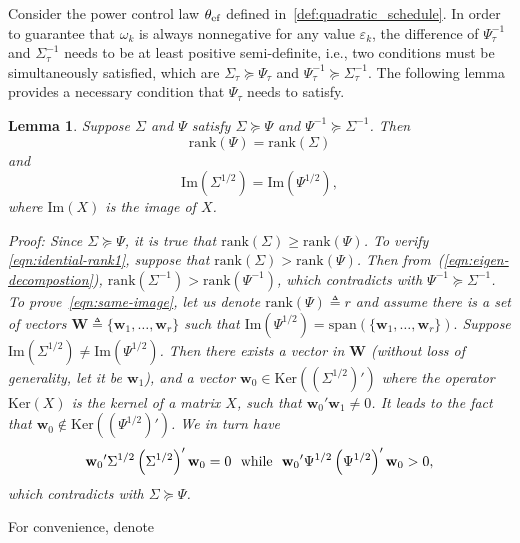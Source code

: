 \documentclass[twocolumn]{autart}    \usepackage{cite}
\newtheorem{lemma}[theorem]{Lemma}
\begin{document}
{{Consider the power control law $\theta_{\rm ef}$ defined in~\eqref{def:quadratic_schedule}.
In order to guarantee that $\omega_k$ is always nonnegative for any value $\varepsilon_k$, the difference of
$\Psi_\tau^{-1}$ and $\Sigma_\tau^{-1}$ needs to
be at least positive semi-definite, i.e.,
two conditions must be simultaneously satisfied, which
are  $\Sigma_\tau\succeq\Psi
_\tau$ and $\Psi_\tau^{-1}\succeq\Sigma
_\tau^{-1}.$ The following lemma
provides a necessary condition that $\Psi_\tau$ needs to satisfy.
\begin{lemma}\label{lemma:sigma-psi-property}
Suppose $\Sigma$ and $\Psi$ satisfy $\Sigma\succeq\Psi
$ and $\Psi^{-1}\succeq\Sigma^{-1}$. Then
\begin{equation}\label{eqn:idential-rank1}
\mathrm{rank}(\Psi)=
\mathrm{rank}(\Sigma)
\end{equation}
and
\begin{equation}\label{eqn:same-image}
\mathrm{Im}(\Sigma^{{1}/{2}})=
\mathrm{Im}(\Psi^{{1}/{2}}),
\end{equation}
where $\mathrm{Im}(X)$ is the image of $X$.
\begin{pf*}{Proof:}
Since $\Sigma\succeq \Psi$, it is true that
$\mathrm{rank}(\Sigma)\geq
\mathrm{rank}(\Psi)$.
To verify \eqref{eqn:idential-rank1}, suppose that $\mathrm{rank}(\Sigma)>
\mathrm{rank}(\Psi)$.
Then from~(\ref{eqn:eigen-decompostion}), $\mathrm{rank}(\Sigma^{-1})>
\mathrm{rank}(\Psi^{-1})$,
which contradicts with $\Psi^{-1}\succeq\Sigma^{-1}$.
To prove~\eqref{eqn:same-image}, let us
denote $\mathrm{rank}(\Psi)\triangleq r$ and  assume there is a set of vectors $\mathbf{W}\triangleq\{\mathbf{w}_1,\ldots,
\mathbf{w}_r\}$
such that
$\mathrm{Im}(\Psi^{{1}/{2}})=
\mathrm{span}\left(
\{\mathbf{w}_1,\ldots,\mathbf{w}_r\}
\right).$
Suppose $\mathrm{Im}(\Sigma^{{1}/{2}})
\neq\mathrm{Im}(\Psi^{{1}/{2}})$. Then
there exists a vector in
$\mathbf{W}$ (without
loss of generality, let it be $\mathbf{w}_1$),
and a vector $\mathbf{w}_0
\in\mathrm{Ker}
\left((\Sigma^{1/2})'\right)$
where the operator $\mathrm{Ker}(X)$ is the kernel of a matrix $X$, such that ${\mathbf{w}_0}'
\mathbf{w}_1\neq 0$.
It leads to the fact that
$\mathbf{w}_0\not\in \mathrm{Ker}
\left((\Psi^{1/2})'\right)$.
We in turn have
$${\mathbf{w}_0}'\Sigma^{{1}/{2}}
\left(\Sigma^{{1}/{2}}\right)'
\mathbf{w}_0=0\hbox{~~while~~}
{\mathbf{w}_0}'\Psi^{{1}/{2}}
\left(\Psi^{{1}/{2}}\right)'
\mathbf{w}_0>0,
$$
which contradicts with $\Sigma\succeq\Psi$.
\end{pf*}
\end{lemma}
For convenience, denote
}}
\end{document}
